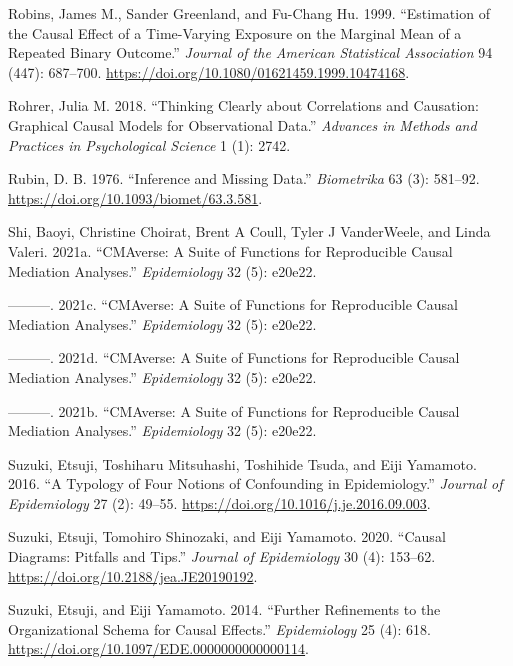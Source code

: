 \documentclass[
  singlecolumn]{report}
\newlength{\cslhangindent}
\newlength{\cslentryspacingunit} %
\newenvironment{CSLReferences}[2] %
 {%
  \setlength{\parindent}{0pt}
  \ifodd #1
  \let\oldpar\par
  \def\par{\hangindent=\cslhangindent\oldpar}
  \fi
  \setlength{\parskip}{#2\cslentryspacingunit}
 }%
 {}
\begin{document}
\begin{CSLReferences}{1}{0}
\leavevmode{}%
Robins, James M., Sander Greenland, and Fu-Chang Hu. 1999. {``Estimation
of the Causal Effect of a Time-Varying Exposure on the Marginal Mean of
a Repeated Binary Outcome.''} \emph{Journal of the American Statistical
Association} 94 (447): 687--700.
\url{https://doi.org/10.1080/01621459.1999.10474168}.

\leavevmode{}%
Rohrer, Julia M. 2018. {``Thinking Clearly about Correlations and
Causation: Graphical Causal Models for Observational Data.''}
\emph{Advances in Methods and Practices in Psychological Science} 1 (1):
2742.

\leavevmode{}%
Rubin, D. B. 1976. {``Inference and Missing Data.''} \emph{Biometrika}
63 (3): 581--92. \url{https://doi.org/10.1093/biomet/63.3.581}.

\leavevmode{}%
Shi, Baoyi, Christine Choirat, Brent A Coull, Tyler J VanderWeele, and
Linda Valeri. 2021a. {``CMAverse: A Suite of Functions for Reproducible
Causal Mediation Analyses.''} \emph{Epidemiology} 32 (5): e20e22.

\leavevmode{}%
---------. 2021c. {``CMAverse: A Suite of Functions for Reproducible
Causal Mediation Analyses.''} \emph{Epidemiology} 32 (5): e20e22.

\leavevmode{}%
---------. 2021d. {``CMAverse: A Suite of Functions for Reproducible
Causal Mediation Analyses.''} \emph{Epidemiology} 32 (5): e20e22.

\leavevmode{}%
---------. 2021b. {``CMAverse: A Suite of Functions for Reproducible
Causal Mediation Analyses.''} \emph{Epidemiology} 32 (5): e20e22.

\leavevmode{}%
Suzuki, Etsuji, Toshiharu Mitsuhashi, Toshihide Tsuda, and Eiji
Yamamoto. 2016. {``A Typology of Four Notions of Confounding in
Epidemiology.''} \emph{Journal of Epidemiology} 27 (2): 49--55.
\url{https://doi.org/10.1016/j.je.2016.09.003}.

\leavevmode{}%
Suzuki, Etsuji, Tomohiro Shinozaki, and Eiji Yamamoto. 2020. {``Causal
Diagrams: Pitfalls and Tips.''} \emph{Journal of Epidemiology} 30 (4):
153--62. \url{https://doi.org/10.2188/jea.JE20190192}.

\leavevmode{}%
Suzuki, Etsuji, and Eiji Yamamoto. 2014. {``Further Refinements to the
Organizational Schema for Causal Effects.''} \emph{Epidemiology} 25 (4):
618. \url{https://doi.org/10.1097/EDE.0000000000000114}.


\end{CSLReferences}
\end{document}
